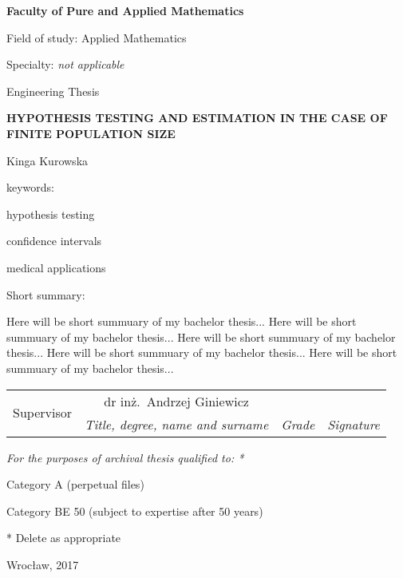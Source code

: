 \documentclass[12pt,a4paper,twoside]{book}
\begin{document}
\begin{titlepage}
\noindent\textbf{\large Faculty of Pure and Applied Mathematics}
\par\medskip\noindent
Field of study: Applied Mathematics
\par\noindent
Specialty: \textit{not applicable}
\vspace*{36pt}
\begin{center}
\LARGE Engineering Thesis
\end{center}
\vspace*{24pt}
\begin{center}
\uppercase{\Large\bfseries%
Hypothesis Testing and Estimation in the Case of Finite Population Size}
\end{center}
\vspace*{12pt}
\begin{center}
Kinga Kurowska
\end{center}
\vspace*{12pt}
\begin{flushright}
keywords:\par\noindent
hypothesis testing\par\noindent
confidence intervals\par\noindent
medical applications \par\noindent
\end{flushright}
\begin{flushleft}
Short summary:\par
Here will be short summuary of my bachelor thesis... Here will be short summuary of my bachelor thesis... Here will be short summuary of my bachelor thesis... Here will be short summuary of my bachelor thesis... Here will be short summuary of my bachelor thesis...
\smallskip
\end{flushleft}
\begin{tabularx}{\textwidth}{|l|c|X|X|}
	\hline
	\multirow{2}{*}{\footnotesize Supervisor} & {\small dr inż.\ Andrzej Giniewicz} &  &  \\
	\cline{2-4}
	& \textit{\footnotesize Title, degree, name and surname} & \textit{\footnotesize Grade} & \textit{\footnotesize Signature} \\
	\hline
\end{tabularx}
\smallskip
\begin{flushleft}
\small\itshape
For the purposes of archival thesis qualified to: *
\begin{compactenum}
\item Category A (perpetual files)
\item Category BE 50 (subject to expertise after 50 years)
\end{compactenum}
* Delete as appropriate
\end{flushleft}
\vspace*{12pt}
\begin{flushright}
\end{flushright}
\vspace*{12pt}
\begin{center}
Wrocław, 2017
\end{center}
\end{titlepage}
\restoregeometry
\end{document}

